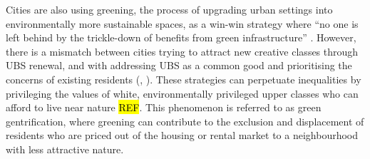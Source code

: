 \documentclass{article}
\begin{document}
Cities are also using greening, the process of upgrading urban settings into environmentally more sustainable spaces,  as a win-win strategy where ``no one is left behind by the trickle-down of benefits from green infrastructure'' \parencite{anguelovski2021green}. However, there is a mismatch between cities trying to attract new creative classes through UBS renewal, and with addressing UBS as a common good and prioritising the concerns of existing residents (\cite{wessells2014urban}, \cite{anguelovski2020expanding}).
These strategies can perpetuate inequalities by privileging the values of white, environmentally privileged upper classes who can afford to live near nature \parencite{REF} \hl{REF}. This phenomenon is referred to as green gentrification, where greening can contribute to the exclusion and displacement of residents who are priced out of the housing or rental market to a neighbourhood with less attractive nature.
\end{document}
